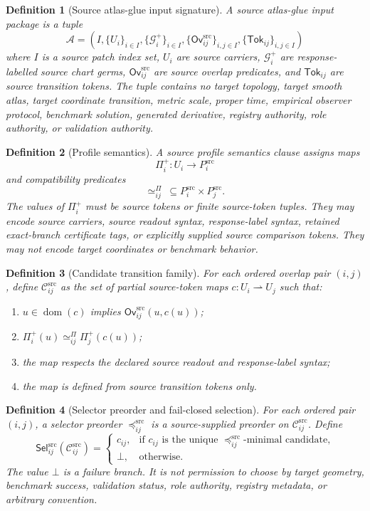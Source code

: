 \documentclass[11pt]{article}
\newcommand{\Germ}{\mathcal{G}^{+}}
\newcommand{\Ovsrc}{\mathsf{Ov}^{\mathrm{src}}}
\newcommand{\Prof}{\Pi^{+}}
\newcommand{\Cand}{\mathcal{C}^{\mathrm{src}}}
\newcommand{\Sel}{\mathsf{Sel}^{\mathrm{src}}}
\newcommand{\Bot}{\bot}
\newtheorem{definition}{Definition}
\begin{document}
\begin{definition}[Source atlas-glue input signature]
A source atlas-glue input package is a tuple
\[
  \mathcal A =
  (I,\{U_i\}_{i\in I},\{\Germ_i\}_{i\in I},\{\Ovsrc_{ij}\}_{i,j\in I},
  \{\mathsf{Tok}_{ij}\}_{i,j\in I})
\]
where \(I\) is a source patch index set, \(U_i\) are source carriers,
\(\Germ_i\) are response-labelled source chart germs, \(\Ovsrc_{ij}\) are
source overlap predicates, and \(\mathsf{Tok}_{ij}\) are source transition
tokens. The tuple contains no target topology, target smooth atlas, target
coordinate transition, metric scale, proper time, empirical observer
protocol, benchmark solution, generated derivative, registry authority, role
authority, or validation authority.
\end{definition}

\begin{definition}[Profile semantics]
A source profile semantics clause assigns maps
\[
  \Prof_i:U_i \longrightarrow P_i^{\mathrm{src}}
\]
and compatibility predicates
\[
  \simeq^{\Pi}_{ij}\ \subseteq P_i^{\mathrm{src}}\times P_j^{\mathrm{src}}.
\]
The values of \(\Prof_i\) must be source tokens or finite source-token
tuples. They may encode source carriers, source readout syntax, response-label
syntax, retained exact-branch certificate tags, or explicitly supplied source
comparison tokens. They may not encode target coordinates or benchmark
behavior.
\end{definition}

\begin{definition}[Candidate transition family]
For each ordered overlap pair \((i,j)\), define \(\Cand_{ij}\) as the set of
partial source-token maps \(c:U_i\rightharpoonup U_j\) such that:
\begin{enumerate}
  \item \(u\in\operatorname{dom}(c)\) implies \(\Ovsrc_{ij}(u,c(u))\);
  \item \(\Prof_i(u)\simeq^{\Pi}_{ij}\Prof_j(c(u))\);
  \item the map respects the declared source readout and response-label
  syntax;
  \item the map is defined from source transition tokens only.
\end{enumerate}
\end{definition}

\begin{definition}[Selector preorder and fail-closed selection]
For each ordered pair \((i,j)\), a selector preorder
\(\preceq^{\mathrm{src}}_{ij}\) is a source-supplied preorder on
\(\Cand_{ij}\). Define
\[
  \Sel_{ij}(\Cand_{ij}) =
  \begin{cases}
    c_{ij}, & \text{if \(c_{ij}\) is the unique
    \(\preceq^{\mathrm{src}}_{ij}\)-minimal candidate,}\\
    \Bot, & \text{otherwise.}
  \end{cases}
\]
The value \(\Bot\) is a failure branch. It is not permission to choose by
target geometry, benchmark success, validation status, role authority,
registry metadata, or arbitrary convention.
\end{definition}
\end{document}
